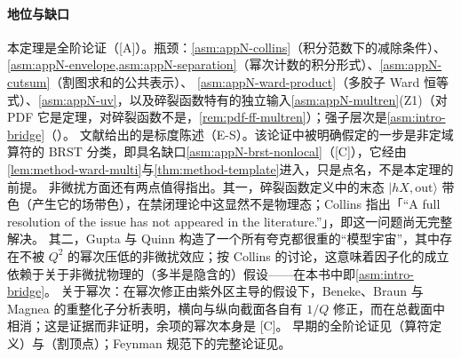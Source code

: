 \paragraph{地位与缺口}
本定理是全阶论证（[A]）。瓶颈：\cref{asm:appN-collins}（积分范数下的减除条件）、\cref{asm:appN-envelope,asm:appN-separation}（幂次计数的积分形式）、\cref{asm:appN-cutsum}（割图求和的公共表示）、
\cref{asm:appN-ward-product}（多胶子 Ward 恒等式）、\cref{asm:appN-uv}，以及碎裂函数特有的独立输入\cref{asm:appN-multren}(Z1)（对 PDF 它是定理，对碎裂函数不是，\cref{rem:pdf-ff-multren}）；强子层次是\cref{asm:intro-bridge}（\tagC）。
文献给出的是标度陈述（E-S）。该论证中被明确假定的一步是非定域算符的 BRST 分类\cite[第~11.3.2~节]{Collins2011}，即具名缺口\cref{asm:appN-brst-nonlocal}（[C]），它经由\cref{lem:method-ward-multi}与\cref{thm:method-template}进入，只是点名，不是本定理的前提。
非微扰方面还有两点值得指出。其一，碎裂函数定义中的末态 $|hX,\mathrm{out}\rangle$ 带色（产生它的场带色），在禁闭理论中这显然不是物理态；Collins 指出「“A full resolution of the issue has not appeared in the literature.”」\cite[第~12.8.9~节]{Collins2011}，即这一问题尚无完整解决。
其二，Gupta 与 Quinn 构造了一个所有夸克都很重的“模型宇宙”，其中存在不被 $Q^2$ 的幂次压低的非微扰效应\cite{Gupta:1981ve}；按 Collins 的讨论，这意味着因子化的成立依赖于关于非微扰物理的（多半是隐含的）假设\cite[第~12.12~节]{Collins2011}——在本书中即\cref{asm:intro-bridge}。
关于幂次：在幂次修正由紫外区主导的假设下，Beneke、Braun 与 Magnea 的重整化子分析表明，横向与纵向截面各自有 $1/Q$ 修正，而在总截面中相消\cite{BenekeBraunMagnea1997}；这是证据而非证明，余项的幂次本身是 [C]。
早期的全阶论证见\cite{CollinsSoper1982a}（算符定义）与\cite{Mueller1978}（割顶点）；Feynman 规范下的完整论证见\cite[第~12.5--12.8~节]{Collins2011}。

